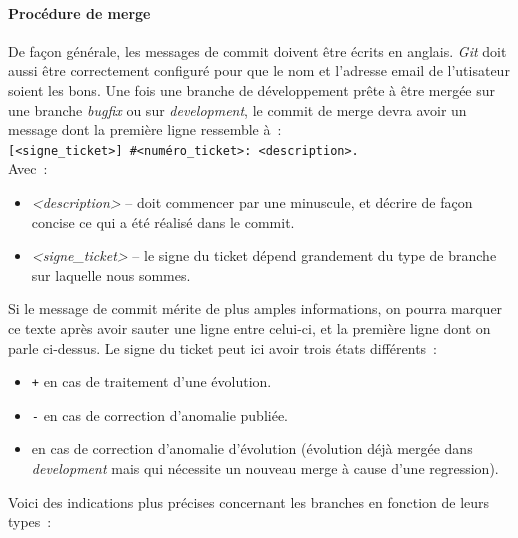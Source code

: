 \paragraph{Procédure de merge}
De façon générale, les messages de commit doivent être écrits en anglais. \emph{Git} doit aussi être correctement configuré pour que le nom et l'adresse email de l'utisateur soient les bons.
Une fois une branche de développement prête à être mergée sur une branche \emph{bugfix} ou sur \emph{development}, le commit de merge devra avoir un message dont la première ligne ressemble à~:\\
{\tt[<signe\_ticket>] \#<numéro\_ticket>: <description>.}\\
Avec~:
\begin{itemize}
	\item\emph{<description>} -- doit commencer par une minuscule, et décrire de façon concise ce qui a été réalisé dans le commit.
	\item\emph{<signe\_ticket>} -- le signe du ticket dépend grandement du type de branche sur laquelle nous sommes.
\end{itemize}
Si le message de commit mérite de plus amples informations, on pourra marquer ce texte après avoir sauter une ligne entre celui-ci, et la première ligne dont on parle ci-dessus.
	Le signe du ticket peut ici avoir trois états différents~:
		\begin{itemize}
			\item {\tt+} en cas de traitement d'une évolution.
			\item {\tt-} en cas de correction d'anomalie publiée.
			\item {\tt*} en cas de correction d'anomalie d'évolution (évolution déjà mergée dans \emph{development} mais qui nécessite un nouveau merge à cause d'une regression).
		\end{itemize}
Voici des indications plus précises concernant les branches en fonction de leurs types~:
